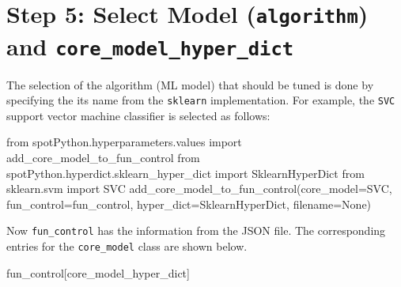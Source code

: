 \documentclass[
  letterpaper,
  DIV=11,
  numbers=noendperiod]{scrreprt}
\newenvironment{Shaded}{\begin{snugshade}}{\end{snugshade}}
\newcommand{\ImportTok}[1]{\textcolor[rgb]{0.00,0.46,0.62}{#1}}
\newcommand{\NormalTok}[1]{\textcolor[rgb]{0.00,0.23,0.31}{#1}}
\newcommand{\OperatorTok}[1]{\textcolor[rgb]{0.37,0.37,0.37}{#1}}
\newcommand{\StringTok}[1]{\textcolor[rgb]{0.13,0.47,0.30}{#1}}
\newcommand{\VariableTok}[1]{\textcolor[rgb]{0.07,0.07,0.07}{#1}}
\begin{document}
\hypertarget{step-5-select-model-algorithm-and-core_model_hyper_dict}{%
\section{\texorpdfstring{Step 5: Select Model (\texttt{algorithm}) and
\texttt{core\_model\_hyper\_dict}}{Step 5: Select Model (algorithm) and core\_model\_hyper\_dict}}\label{step-5-select-model-algorithm-and-core_model_hyper_dict}}

The selection of the algorithm (ML model) that should be tuned is done
by specifying the its name from the \texttt{sklearn} implementation. For
example, the \texttt{SVC} support vector machine classifier is selected
as follows:

\begin{Shaded}
\begin{Highlighting}[]
\ImportTok{from}\NormalTok{ spotPython.hyperparameters.values }\ImportTok{import}\NormalTok{ add\_core\_model\_to\_fun\_control}
\ImportTok{from}\NormalTok{ spotPython.hyperdict.sklearn\_hyper\_dict }\ImportTok{import}\NormalTok{ SklearnHyperDict}
\ImportTok{from}\NormalTok{ sklearn.svm }\ImportTok{import}\NormalTok{ SVC}
\NormalTok{add\_core\_model\_to\_fun\_control(core\_model}\OperatorTok{=}\NormalTok{SVC,}
\NormalTok{                              fun\_control}\OperatorTok{=}\NormalTok{fun\_control,}
\NormalTok{                              hyper\_dict}\OperatorTok{=}\NormalTok{SklearnHyperDict,}
\NormalTok{                              filename}\OperatorTok{=}\VariableTok{None}\NormalTok{)}
\end{Highlighting}
\end{Shaded}

Now \texttt{fun\_control} has the information from the JSON file. The
corresponding entries for the \texttt{core\_model} class are shown
below.

\begin{Shaded}
\begin{Highlighting}[]
\NormalTok{fun\_control[}\StringTok{\textquotesingle{}core\_model\_hyper\_dict\textquotesingle{}}\NormalTok{]}
\end{Highlighting}
\end{Shaded}
\end{document}
